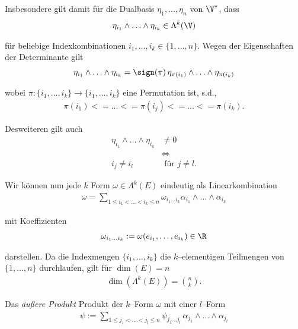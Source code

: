 \par
Insbesondere gilt damit für die Dualbasis \(\eta_1,\ldots,\eta_n\) von \(\V^*\), dass
\begin{align*}
\eta_{i_1}\wedge\ldots\wedge\eta_{i_k}\in\Lambda^k(\V)
\end{align*}
\par
für beliebige Indexkombinationen \(i_1,\ldots,i_k \in \{1,\ldots,n \}\). Wegen der Eigenschaften der Determinante gilt
\begin{align*}
\eta_{i_1}\wedge\ldots\wedge\eta_{i_k} = \sign(\pi)\, \eta_{\pi(i_1)}\wedge\ldots\wedge\eta_{\pi(i_k)}\end{align*}
\par
wobei \(\pi:\{i_1,\ldots,i_k\}\rightarrow\{i_1,\ldots,i_k\}\) eine Permutation ist, s.d.,
\begin{align*}
\pi(i_1) <= \ldots <= \pi(i_j) <= \ldots <= \pi(i_k).
\end{align*}
\par
Desweiteren gilt auch
\begin{align*}
\eta_{i_1}\wedge\ldots\wedge\eta_{i_k} &\neq 0\\
&\Leftrightarrow \\
i_{j}\neq i_l&\text{ für } j\neq l.
\end{align*}
\par
Wir können nun jede \(k\) Form \(\omega\in\Lambda^k(E)\) eindeutig als Linearkombination
\begin{align*}
\omega = \sum_{1\leq i_1<\ldots<i_k\leq n}\omega_{i_1\ldots i_k}
\alpha_{i_1}\wedge\ldots\wedge\alpha_{i_k}
\end{align*}
\par
mit Koeffizienten
\begin{align*}
\omega_{i_1\ldots i_k} := \omega(e_{i_1},\ldots,e_{i_k})\in\R
\end{align*}
\par
darstellen. Da
die Indexmengen \(\{i_1,\ldots ,i_k\}\) die \(k\)–elementigen Teilmengen von\(\{1,\ldots,n\}\) durchlaufen, gilt
für \(\dim(E)=n\)
\begin{align*}
\dim\left(\Lambda^k(E)\right) = {n\choose k}.
\end{align*}
\par
Das  \emph{äußere Produkt}
Produkt der \(k\)–Form \(\omega\) mit einer \(l\)–Form
\begin{align*}
\psi := \sum_{1\leq j_1<\ldots<j_{l}\leq n}\psi_{j_1\ldots j_l}\,
\alpha_{j_1}\wedge\ldots\wedge\alpha_{j_l}
\end{align*}
\par
